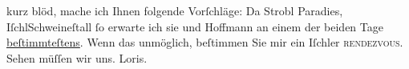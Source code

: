 \begin{ledgroupsized}[t]{13cm}
               kurz blöd, mache ich Ihnen folgende Vorſchläge: Da Strobl Paradies, IſchlSchweineſtall ſo erwarte ich sie und Hoffmann an einem der beiden Tage \uline{beſtimmteſtens}.\pend
           \pstart
           Wenn das unmöglich, beſtimmen Sie
               mir ein Iſchler \textsc{rendezvous}. Sehen müſſen wir uns.\pend
           \pstart \spacefill\mbox{Loris.}\pend{}
         
         \endnumbering{}\end{ledgroupsized}  \newcommand{\dateiname}{L00032}\newcommand{\titel}{Hugo von Hofmannsthal an Arthur Schnitzler, 12. 8. 1891}\newcommand{\editorInnen}{Martin Anton Müller und Gerd-Hermann Susen}
      